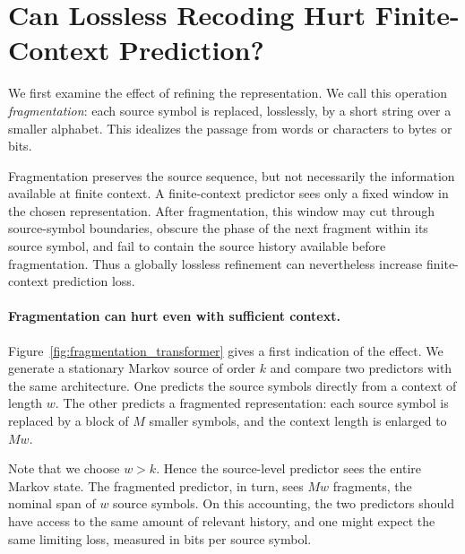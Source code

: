 \documentclass{article}
\theoremstyle{plain}
\theoremstyle{definition}
\theoremstyle{remark}
\begin{document}
    
    \section{Can Lossless Recoding Hurt Finite-Context Prediction?}\label{sec:fragmentation}
    We first examine the effect of refining the representation.  We call this
    operation \emph{fragmentation}: each source symbol is replaced, losslessly,
    by a short string over a smaller alphabet.  This idealizes the passage from
    words or characters to bytes or bits.
    
    Fragmentation preserves the source sequence, but not necessarily the
    information available at finite context.  A finite-context predictor sees
    only a fixed window in the chosen representation.  After fragmentation, this
    window may cut through source-symbol boundaries, obscure the phase of the
    next fragment within its source symbol, and fail to contain the source
    history available before fragmentation.  Thus a globally lossless refinement
    can nevertheless increase finite-context prediction loss.
    
    \paragraph{Fragmentation can hurt even with sufficient context.}
    Figure~\ref{fig:fragmentation_transformer} gives a first indication of the
    effect.  We generate a stationary Markov source of order $k$ and compare two
    predictors with the same architecture.  One predicts the source symbols
    directly from a context of length $w$.  The other predicts a fragmented
    representation: each source symbol is replaced by a block of $M$ smaller
    symbols, and the context length is enlarged to $Mw$.
    
    Note that we choose $w>k$.  Hence the source-level predictor sees the entire Markov
    state.  The fragmented predictor, in turn, sees $Mw$ fragments, the nominal
    span of $w$ source symbols.  On this accounting, the two predictors should
    have access to the same amount of relevant history, and one might expect the
    same limiting loss, measured in bits per source symbol.
    
\end{document}
